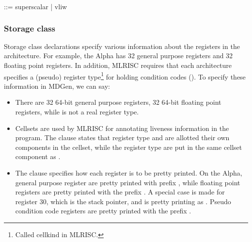 \begin{SML}
    ::= superscalar | vliw
\end{SML}

\subsubsection{Storage class}

Storage class declarations specify various information about the
registers in the architecture.  For example, the Alpha has 32 general
purpose registers and 32 floating point registers.  In addition, MLRISC
requires that each architecture specifies a (pseudo) register 
type\footnote{Called cellkind in MLRISC.} for 
holding condition codes (). 
To specify these information in MDGen, we can say:


\begin{itemize}
  \item There are 32 64-bit general purpose registers,
32 64-bit floating point registers, while  is not a 
real register type. 
  \item Cellsets
are used by MLRISC for annotating liveness information in the program.
  The clause  states that register type  
and  are allotted their own components in the cellset,    
while the register type  are put
in the same cellset component as .
  \item The clause  specifies
   how each register is to be pretty printed.  On the Alpha, general 
   purpose register are pretty printed with prefix \sml{$}, while
   floating point registers are pretty printed with the prefix . 
   A special case is made for register 30, which is the stack pointer, and 
   is pretty printing as .  Pseudo condition code registers
   are pretty printed with the prefix .   
\end{itemize}

